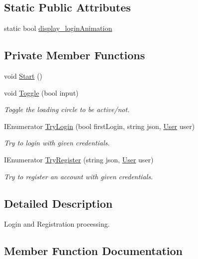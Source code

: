 \subsection*{Static Public Attributes}
\begin{DoxyCompactItemize}
\item 
static bool \mbox{\hyperlink{class_authenticate_user_abb9961dab19aac74a73ca4fb1b9e60a6}{display\+\_\+login\+Animation}}
\end{DoxyCompactItemize}
\subsection*{Private Member Functions}
\begin{DoxyCompactItemize}
\item 
void \mbox{\hyperlink{class_authenticate_user_a2fede13427963bbcdd6a7d09a6846f3a}{Start}} ()
\item 
void \mbox{\hyperlink{class_authenticate_user_a58d5801c4d4ea321321ae7729a17ef7f}{Toggle}} (bool input)
\begin{DoxyCompactList}\small\item\em Toggle the loading circle to be active/not. \end{DoxyCompactList}\item 
I\+Enumerator \mbox{\hyperlink{class_authenticate_user_a7c2cb46ec083bb2474c6decf4f165773}{Try\+Login}} (bool first\+Login, string json, \mbox{\hyperlink{class_user}{User}} user)
\begin{DoxyCompactList}\small\item\em Try to login with given credentials. \end{DoxyCompactList}\item 
I\+Enumerator \mbox{\hyperlink{class_authenticate_user_a1243f9482a71212db33a555534a1bc97}{Try\+Register}} (string json, \mbox{\hyperlink{class_user}{User}} user)
\begin{DoxyCompactList}\small\item\em Try to register an account with given credentials. \end{DoxyCompactList}\end{DoxyCompactItemize}


\subsection{Detailed Description}
Login and Registration processing. 

\subsection{Member Function Documentation}
\mbox{\label{class_authenticate_user_a6d1abb9b546a5fa3016bb6063e3eabaa}} 
